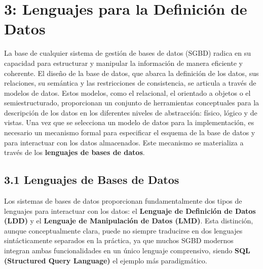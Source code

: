 \chapter{3: Lenguajes para la Definición de Datos}

La base de cualquier sistema de gestión de bases de datos (SGBD) radica en su capacidad para estructurar y manipular la información de manera eficiente y coherente. El diseño de la base de datos, que abarca la definición de los datos, sus relaciones, su semántica y las restricciones de consistencia, se articula a través de modelos de datos. Estos modelos, como el relacional, el orientado a objetos o el semiestructurado, proporcionan un conjunto de herramientas conceptuales para la descripción de los datos en los diferentes niveles de abstracción: físico, lógico y de vistas. Una vez que se selecciona un modelo de datos para la implementación, es necesario un mecanismo formal para especificar el esquema de la base de datos y para interactuar con los datos almacenados. Este mecanismo se materializa a través de los \textbf{lenguajes de bases de datos}.

\section{3.1 Lenguajes de Bases de Datos}

Los sistemas de bases de datos proporcionan fundamentalmente dos tipos de lenguajes para interactuar con los datos: el \textbf{Lenguaje de Definición de Datos (LDD)} y el \textbf{Lenguaje de Manipulación de Datos (LMD)}. Esta distinción, aunque conceptualmente clara, puede no siempre traducirse en dos lenguajes sintácticamente separados en la práctica, ya que muchos SGBD modernos integran ambas funcionalidades en un único lenguaje comprensivo, siendo \textbf{SQL (Structured Query Language)} el ejemplo más paradigmático.

